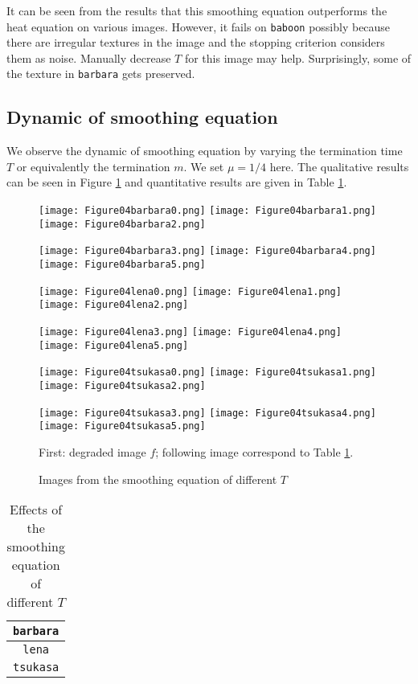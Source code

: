 \documentclass[english, nochinese]{pnote}
\begin{document}
It can be seen from the results that this smoothing equation outperforms the heat equation on various images. However, it fails on \verb"baboon" possibly because there are irregular textures in the image and the stopping criterion considers them as noise. Manually decrease $T$ for this image may help. Surprisingly, some of the texture in \verb"barbara" gets preserved.

\subsection{Dynamic of smoothing equation}

We observe the dynamic of smoothing equation by varying the termination time $T$ or equivalently the termination $m$. We set $ \mu = 1 / 4 $ here. The qualitative results can be seen in Figure \ref{Fig:SmoothDyn} and quantitative results are given in Table \ref{Tbl:SmoothDyn}.

\begin{figure}[htb]
{
\centering

\texttt{[image: Figure04barbara0.png]}
\texttt{[image: Figure04barbara1.png]}
\texttt{[image: Figure04barbara2.png]}

\texttt{[image: Figure04barbara3.png]}
\texttt{[image: Figure04barbara4.png]}
\texttt{[image: Figure04barbara5.png]}

\texttt{[image: Figure04lena0.png]}
\texttt{[image: Figure04lena1.png]}
\texttt{[image: Figure04lena2.png]}

\texttt{[image: Figure04lena3.png]}
\texttt{[image: Figure04lena4.png]}
\texttt{[image: Figure04lena5.png]}

\texttt{[image: Figure04tsukasa0.png]}
\texttt{[image: Figure04tsukasa1.png]}
\texttt{[image: Figure04tsukasa2.png]}

\texttt{[image: Figure04tsukasa3.png]}
\texttt{[image: Figure04tsukasa4.png]}
\texttt{[image: Figure04tsukasa5.png]}

\caption{Images from the smoothing equation of different $T$}
\label{Fig:SmoothDyn}
}
{
\footnotesize First: degraded image $f$; following image correspond to Table \ref{Tbl:SmoothDyn}.
}
\end{figure}

\begin{table}[htb]
\centering
\begin{tabular}{|c|c|c|c|c|c|c|}
\hline
\multicolumn{7}{|c|}{\texttt{barbara}} \\
\hline

\multicolumn{7}{|c|}{\texttt{lena}} \\
\hline

\multicolumn{7}{|c|}{\texttt{tsukasa}} \\
\hline

\end{tabular}
\caption{Effects of the smoothing equation of different $T$}
\label{Tbl:SmoothDyn}
\end{table}
\end{document}
